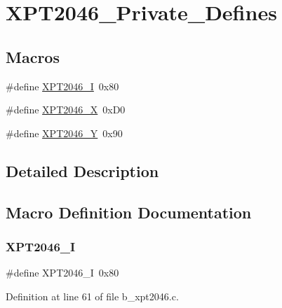 \hypertarget{group___x_p_t2046___private___defines}{}\section{X\+P\+T2046\+\_\+\+Private\+\_\+\+Defines}
\label{group___x_p_t2046___private___defines}
\subsection*{Macros}
\begin{DoxyCompactItemize}
\item 
\#define \mbox{\hyperlink{group___x_p_t2046___private___defines_ga69b10e1767179197068d54509be8d24a}{X\+P\+T2046\+\_\+I}}~0x80
\item 
\#define \mbox{\hyperlink{group___x_p_t2046___private___defines_ga50464f62d694f608197be7b2c62926df}{X\+P\+T2046\+\_\+X}}~0x\+D0
\item 
\#define \mbox{\hyperlink{group___x_p_t2046___private___defines_ga79b991e9cfafa846ebb27f6c00a3f09a}{X\+P\+T2046\+\_\+Y}}~0x90
\end{DoxyCompactItemize}


\subsection{Detailed Description}


\subsection{Macro Definition Documentation}
\mbox{\label{group___x_p_t2046___private___defines_ga69b10e1767179197068d54509be8d24a}} 
\subsubsection{\texorpdfstring{X\+P\+T2046\+\_\+I}{XPT2046\_I}}
{\footnotesize\ttfamily \#define X\+P\+T2046\+\_\+I~0x80}



Definition at line 61 of file b\+\_\+xpt2046.\+c.

